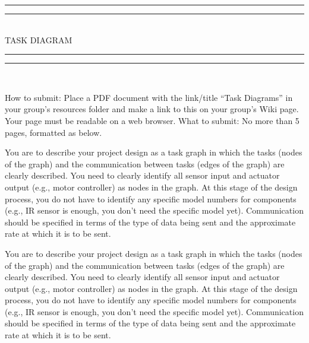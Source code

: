 
\begin{titlepage}

\centering
\vspace*{\baselineskip}

\rule{\textwidth}{1.6pt}\vspace*{-\baselineskip}\vspace*{2pt}
\rule{\textwidth}{0.4pt}\\[\baselineskip]

{\LARGE TASK DIAGRAM}\\[0.2\baselineskip]

\rule{\textwidth}{0.4pt}\vspace*{-\baselineskip}\vspace{3.2pt}
\rule{\textwidth}{1.6pt}\\[\baselineskip]

\wl

\scshape
{\small How to submit: Place a PDF document with the link/title ``Task Diagrams'' in your group's resources folder and make a link to this on your group's Wiki page. Your page must be readable on a web browser. What to submit: No more than 5 pages, formatted as below. \\
\wl

You are to describe your project design as a task graph in which the tasks (nodes of the graph) and the communication between tasks (edges of the graph) are clearly described. You need to clearly identify all sensor input and actuator output (e.g., motor controller) as nodes in the graph. At this stage of the design process, you do not have to identify any specific model numbers for components (e.g., IR sensor is enough, you don't need the specific model yet). Communication should be specified in terms of the type of data being sent and the approximate rate at which it is to be sent.


You are to describe your project design as a task graph in which the tasks (nodes of the graph) and the communication between tasks (edges of the graph) are clearly described. You need to clearly identify all sensor input and actuator output (e.g., motor controller) as nodes in the graph. At this stage of the design process, you do not have to identify any specific model numbers for components (e.g., IR sensor is enough, you don't need the specific model yet). Communication should be specified in terms of the type of data being sent and the approximate rate at which it is to be sent.
\\[\baselineskip]\par}


\end{titlepage}
